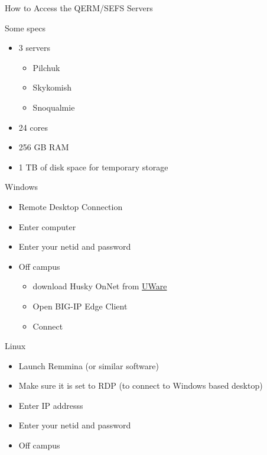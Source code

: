 \documentclass[ignorenonframetext,]{beamer}
\providecommand{\tightlist}{%
  \setlength{\itemsep}{0pt}\setlength{\parskip}{0pt}}
\begin{document}
\begin{frame}{How to Access the QERM/SEFS Servers}

\begin{block}{Some specs}

\begin{itemize}[<+->]
\tightlist
\item
  3 servers

  \begin{itemize}[<+->]
  \tightlist
  \item
    Pilchuk
  \item
    Skykomish
  \item
    Snoqualmie
  \end{itemize}
\item
  24 cores
\item
  256 GB RAM
\item
  1 TB of disk space for temporary storage
\end{itemize}

\end{block}

\begin{block}{Windows}

\begin{itemize}[<+->]
\item
  Remote Desktop Connection
\item
  Enter computer
\item
  Enter your netid and password
\item
  Off campus

  \begin{itemize}[<+->]
  \tightlist
  \item
    download Husky OnNet from
    \href{https://itconnect.uw.edu/connect/uw-networks/about-husky-onnet/use-husky-onnet/terms-conditions/}{UWare}
  \item
    Open BIG-IP Edge Client
  \item
    Connect
  \end{itemize}
\end{itemize}

\end{block}

\begin{block}{Linux}

\begin{itemize}[<+->]
\item
  Launch Remmina (or similar software)
\item
  Make sure it is set to RDP (to connect to Windows based desktop)
\item
  Enter IP addresss
\item
  Enter your netid and password
\item
  Off campus


\end{itemize}
\end{block}
\end{frame}
\end{document}
